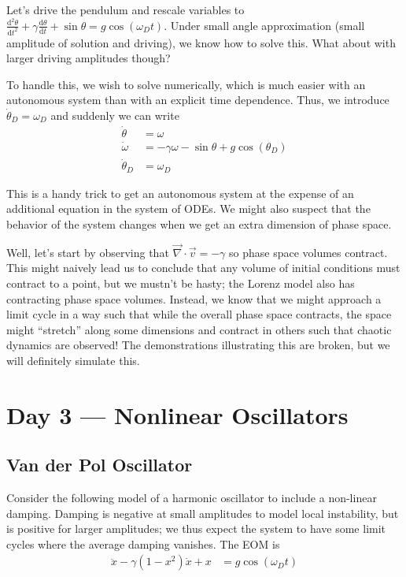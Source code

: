 \documentclass[10pt]{article}
\newcommand{\rd}[2]{\frac{\mathrm{d}#1}{\mathrm{d}#2}}
\newcommand{\rtd}[2]{\frac{\mathrm{d}^2#1}{\mathrm{d}#2^2}}
\begin{document}
Let's drive the pendulum and rescale variables to $\rtd{\theta}{t} + \gamma \rd{\theta}{t} + \sin\theta = g\cos(\omega_D t)$. Under small angle approximation (small amplitude of solution and driving), we know how to solve this. What about with larger driving amplitudes though?

To handle this, we wish to solve numerically, which is much easier with an autonomous system than with an explicit time dependence. Thus, we introduce $\dot{\theta}_D = \omega_D$ and suddenly we can write
\begin{align}
    \dot{\theta} &= \omega \nonumber\\
    \dot{\omega} &= -\gamma \omega - \sin\theta + g\cos(\theta_D) \nonumber\\
    \dot{\theta}_D &= \omega_D
\end{align}

This is a handy trick to get an autonomous system at the expense of an additional equation in the system of ODEs. We might also suspect that the behavior of the system changes when we get an extra dimension of phase space.

Well, let's start by observing that $\vec{\nabla} \cdot \vec{v} = -\gamma$ so phase space volumes contract. This might naively lead us to conclude that any volume of initial conditions must contract to a point, but we mustn't be hasty; the Lorenz model also has contracting phase space volumes. Instead, we know that we might approach a limit cycle in a way such that while the overall phase space contracts, the space might ``stretch'' along some dimensions and contract in others such that chaotic dynamics are observed! The demonstrations illustrating this are broken, but we will definitely simulate this.

\section{Day 3 --- Nonlinear Oscillators}

\subsection{Van der Pol Oscillator}

Consider the following model of a harmonic oscillator to include a non-linear damping. Damping is negative at small amplitudes to model local instability, but is positive for larger amplitudes; we thus expect the system to have some limit cycles where the average damping vanishes. The EOM is
\begin{align}
    \ddot{x} - \gamma(1-x^2)\dot{x} + x &= g\cos(\omega_D t)
\end{align}
\end{document}
